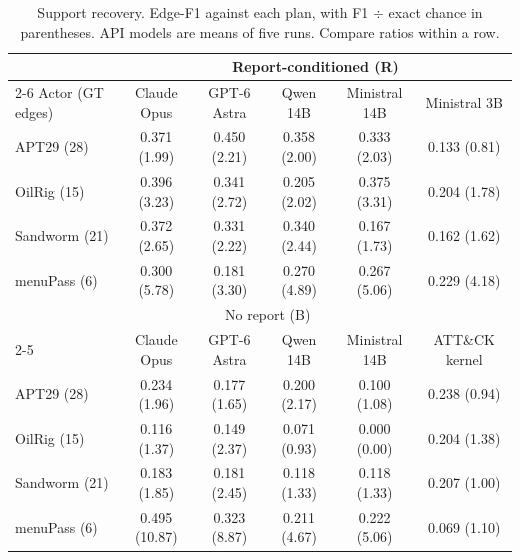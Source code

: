 \begin{table}[t]
\centering
\small
\setlength{\tabcolsep}{5pt}
\begin{tabular}{@{}lccccc@{}}
\toprule
 & \multicolumn{5}{c}{Report-conditioned (R)} \\
\cmidrule(l){2-6}
Actor (GT edges) & Claude Opus & GPT-6 Astra & Qwen 14B & Ministral 14B & Ministral 3B \\
\midrule
APT29 (28) & 0.371 (1.99) & 0.450 (2.21) & 0.358 (2.00) & 0.333 (2.03) & 0.133 (0.81) \\
OilRig (15) & 0.396 (3.23) & 0.341 (2.72) & 0.205 (2.02) & 0.375 (3.31) & 0.204 (1.78) \\
Sandworm (21) & 0.372 (2.65) & 0.331 (2.22) & 0.340 (2.44) & 0.167 (1.73) & 0.162 (1.62) \\
menuPass (6) & 0.300 (5.78) & 0.181 (3.30) & 0.270 (4.89) & 0.267 (5.06) & 0.229 (4.18) \\
\midrule
 & \multicolumn{4}{c}{No report (B)} & \\
\cmidrule(lr){2-5}
 & Claude Opus & GPT-6 Astra & Qwen 14B & Ministral 14B & ATT\&CK kernel \\
\midrule
APT29 (28) & 0.234 (1.96) & 0.177 (1.65) & 0.200 (2.17) & 0.100 (1.08) & 0.238 (0.94) \\
OilRig (15) & 0.116 (1.37) & 0.149 (2.37) & 0.071 (0.93) & 0.000 (0.00) & 0.204 (1.38) \\
Sandworm (21) & 0.183 (1.85) & 0.181 (2.45) & 0.118 (1.33) & 0.118 (1.33) & 0.207 (1.00) \\
menuPass (6) & 0.495 (10.87) & 0.323 (8.87) & 0.211 (4.67) & 0.222 (5.06) & 0.069 (1.10) \\
\bottomrule
\end{tabular}
\caption{Support recovery. Edge-F1 against each plan, with F1 $\div$ exact chance in parentheses. API models are means of five runs. Compare ratios within a row.}
\label{tab:recovery}
\end{table}
